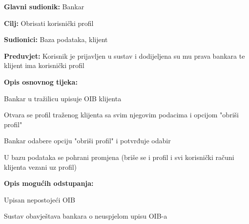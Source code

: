                 
                
                \noindent {}
                \begin{packed_item}
                
                  \item \textbf{Glavni sudionik: }Bankar
                  \item  \textbf{Cilj:} Obrisati korisnički profil 
                  \item  \textbf{Sudionici:} Baza podataka, klijent
                  \item  \textbf{Preduvjet:} Korisnik je prijavljen u sustav i dodijeljena su mu prava bankara te klijent ima korisnički profil
                  \item  \textbf{Opis osnovnog tijeka:}
              
              \item[] \begin{packed_enum}
                
                    \item  Bankar u tražilicu upisuje OIB klijenta
                    \item  Otvara se profil traženog klijenta sa svim njegovim podacima i opcijom "obriši profil"
                    \item  Bankar odabere opciju "obriši profil" i potvrđuje odabir
                    \item  U bazu podataka se pohrani promjena (briše se i profil i svi korisnički računi klijenta vezani uz profil)
                  \end{packed_enum}
                  
                  \item  \textbf{Opis mogućih odstupanja:}
                  
                  \item[] \begin{packed_enum}
                
                    \item[1.a] Upisan nepostojeći OIB
                    \item[] \begin{packed_enum}
                      
                      \item Sustav obavještava bankara o neuspjelom upisu OIB-a 
                    
                  \end{packed_enum}
                \end{packed_enum}
            \end{packed_item}
        
